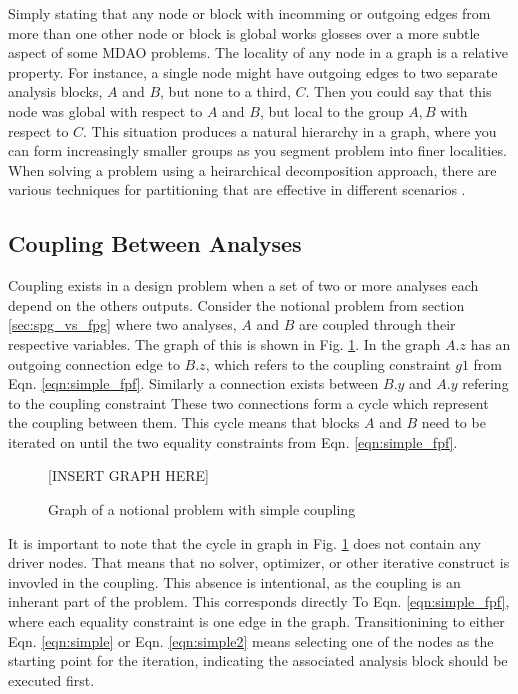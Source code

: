   Simply stating that any node or block with incomming or outgoing edges
  from more than one other node or block is global works glosses over a more 
  subtle aspect of some MDAO problems. The locality of any node in a graph is 
  a relative property. For instance, a single node might have outgoing edges 
  to two separate analysis blocks, $A$ and $B$, but none to a third, $C$. Then 
  you could say that this node was global with respect to $A$ and $B$, but local 
  to the group $A,B$ with respect to $C$. This situation produces a natural 
  hierarchy in a graph, where you can form increasingly smaller groups as you 
  segment problem into finer localities. When solving a problem using 
  a heirarchical decomposition approach, there are various techniques for 
  partitioning that are effective in different scenarios 
  \cite{krishnamachari1997optimal,Perez2004,sobieszczanski1997,allison2009optimal,michelena1997hypergraph}. 


\subsection{Coupling Between Analyses}

  Coupling exists in a design problem when a set of two or more analyses each depend on the
  others outputs. Consider the notional problem from section \ref{sec:spg_vs_fpg} where two 
  analyses, $A$ and $B$ are coupled through their respective variables. The graph of this 
  is shown in Fig. \ref{f:coupling}. In the graph $A.z$ has an outgoing connection 
  edge to $B.z$, which refers to the coupling constraint $g1$ from Eqn. \ref{eqn:simple_fpf}. Similarly a connection exists between $B.y$ and $A.y$ refering to the coupling constraint
  These two connections form a cycle which represent the coupling between them. This cycle means that blocks 
  $A$ and $B$ need to be iterated on until the two equality constraints from Eqn. \ref{eqn:simple_fpf}.

  \begin{figure}
      \begin{center}
      [INSERT GRAPH HERE]
      \caption{Graph of a notional problem with simple coupling \label{f:coupling}}
      \end{center}
  \end{figure}

  It is important to note that the cycle in graph in Fig. \ref{f:coupling} does not contain 
  any driver nodes. That means that no solver, optimizer, or other iterative construct is 
  invovled in the coupling. This absence is intentional, as the coupling is an inherant part 
  of the problem. This corresponds directly To Eqn. \ref{eqn:simple_fpf}, where 
  each equality constraint is one edge in the graph. Transitionining to either 
  Eqn. \ref{eqn:simple} or Eqn. \ref{eqn:simple2} means selecting one of the nodes as the starting point 
  for the iteration, indicating the associated analysis block should be executed first. 

